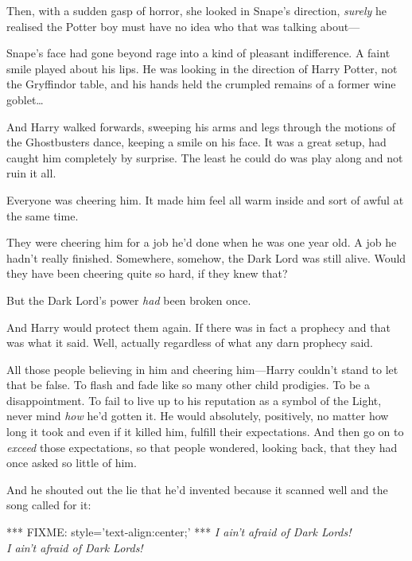 Then, with a sudden gasp of horror, she looked in Snape's direction, \emph{surely} he realised the Potter boy must have no idea who that was talking about---

Snape's face had gone beyond rage into a kind of pleasant indifference. A faint smile played about his lips. He was looking in the direction of Harry Potter, not the Gryffindor table, and his hands held the crumpled remains of a former wine goblet{\ldots}

And Harry walked forwards, sweeping his arms and legs through the motions of the Ghostbusters dance, keeping a smile on his face. It was a great setup, had caught him completely by surprise. The least he could do was play along and not ruin it all.

Everyone was cheering him. It made him feel all warm inside and sort of awful at the same time.

They were cheering him for a job he'd done when he was one year old. A job he hadn't really finished. Somewhere, somehow, the Dark Lord was still alive. Would they have been cheering quite so hard, if they knew that?

But the Dark Lord's power \emph{had} been broken once.

And Harry would protect them again. If there was in fact a prophecy and that was what it said. Well, actually regardless of what any darn prophecy said.

All those people believing in him and cheering him---Harry couldn't stand to let that be false. To flash and fade like so many other child prodigies. To be a disappointment. To fail to live up to his reputation as a symbol of the Light, never mind \emph{how} he'd gotten it. He would absolutely, positively, no matter how long it took and even if it killed him, fulfill their expectations. And then go on to \emph{exceed} those expectations, so that people wondered, looking back, that they had once asked so little of him.

And he shouted out the lie that he'd invented because it scanned well and the song called for it:

*** FIXME: style='text-align:center;' ***
\emph{I ain't afraid of Dark Lords!\\
I ain't afraid of Dark Lords!}

